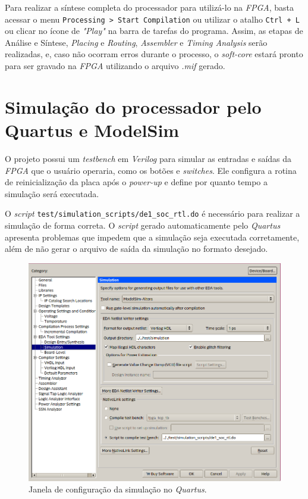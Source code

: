     { Para realizar a síntese completa do processador para utilizá-lo na \textit{FPGA},
        basta acessar o menu \texttt{Processing > Start Compilation} ou utilizar
        o atalho \texttt{Ctrl + L} ou clicar no ícone de \textit{"Play"}
        na barra de tarefas do programa. Assim, as etapas de Análise e Síntese,
        \textit{Placing} e \textit{Routing}, \textit{Assembler} e
        \textit{Timing Analysis} serão realizadas, e, caso não ocorram erros
        durante o processo, o \textit{soft-core} estará pronto para ser
        gravado na \textit{FPGA} utilizando o arquivo \textit{.mif} gerado.
    }


\section{Simulação do processador pelo Quartus e ModelSim}
    { O projeto possui um \textit{testbench} em \textit{Verilog} para simular as
        entradas e saídas da \textit{FPGA} que o usuário operaria, como os botões
        e \textit{switches}. Ele configura a rotina de reinicialização da placa
        após o \textit{power-up} e define por quanto tempo a simulação será
        executada.
    }

    { O \textit{script} \texttt{test/simulation\_scripts/de1\_soc\_rtl.do} é
        necessário para realizar a simulação de forma correta. O \textit{script}
        gerado automaticamente pelo \textit{Quartus} apresenta problemas que
        impedem que a simulação seja executada corretamente, além de não gerar
        o arquivo de saída da simulação no formato desejado.
    }
    \begin{figure}[H]
    \centering
        \includegraphics[width=.6\linewidth]{../images/quartus/simulation_config.png}
        \caption{Janela de configuração da simulação no \textit{Quartus}.}
        \label{fig:quartus_simulation_config}
    \end{figure}

